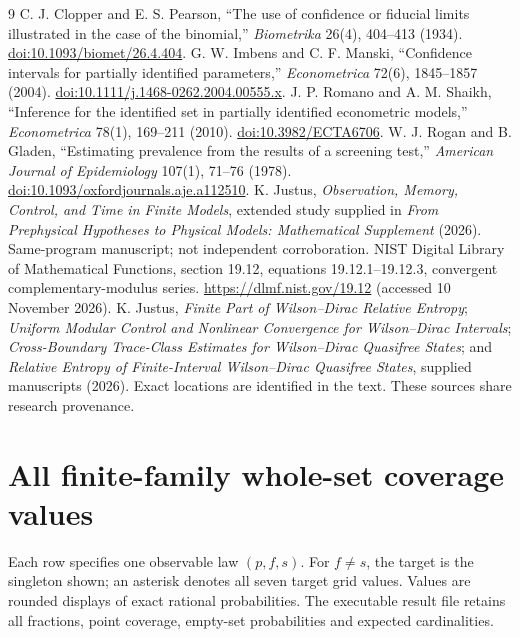 \documentclass[11pt,a4paper]{article}
\theoremstyle{definition}\newtheorem{definition}[theorem]{Definition}
\begin{document}
\begin{thebibliography}{9}
 C. J. Clopper and E. S. Pearson, “The use of confidence or fiducial limits illustrated in the case of the binomial,” \emph{Biometrika} 26(4), 404–413 (1934). \href{https://doi.org/10.1093/biomet/26.4.404}{doi:10.1093/biomet/26.4.404}.
 G. W. Imbens and C. F. Manski, “Confidence intervals for partially identified parameters,” \emph{Econometrica} 72(6), 1845–1857 (2004). \href{https://doi.org/10.1111/j.1468-0262.2004.00555.x}{doi:10.1111/j.1468-0262.2004.00555.x}.
 J. P. Romano and A. M. Shaikh, “Inference for the identified set in partially identified econometric models,” \emph{Econometrica} 78(1), 169–211 (2010). \href{https://doi.org/10.3982/ECTA6706}{doi:10.3982/ECTA6706}.
 W. J. Rogan and B. Gladen, “Estimating prevalence from the results of a screening test,” \emph{American Journal of Epidemiology} 107(1), 71–76 (1978). \href{https://doi.org/10.1093/oxfordjournals.aje.a112510}{doi:10.1093/oxfordjournals.aje.a112510}.
 K. Justus, \emph{Observation, Memory, Control, and Time in Finite Models}, extended study supplied in \emph{From Prephysical Hypotheses to Physical Models: Mathematical Supplement} (2026). Same-program manuscript; not independent corroboration.
 NIST Digital Library of Mathematical Functions, section 19.12, equations 19.12.1–19.12.3, convergent complementary-modulus series. \url{https://dlmf.nist.gov/19.12} (accessed 10 November 2026).
 K. Justus, \emph{Finite Part of Wilson–Dirac Relative Entropy}; \emph{Uniform Modular Control and Nonlinear Convergence for Wilson–Dirac Intervals}; \emph{Cross-Boundary Trace-Class Estimates for Wilson–Dirac Quasifree States}; and \emph{Relative Entropy of Finite-Interval Wilson–Dirac Quasifree States}, supplied manuscripts (2026). Exact locations are identified in the text. These sources share research provenance.
\end{thebibliography}
\clearpage
\appendix
\section{All finite-family whole-set coverage values}\label{app:all}
Each row specifies one observable law $(p,f,s)$. For $f\ne s$, the target is the singleton shown; an asterisk denotes all seven target grid values. Values are rounded displays of exact rational probabilities. The executable result file retains all fractions, point coverage, empty-set probabilities and expected cardinalities.

\end{document}
